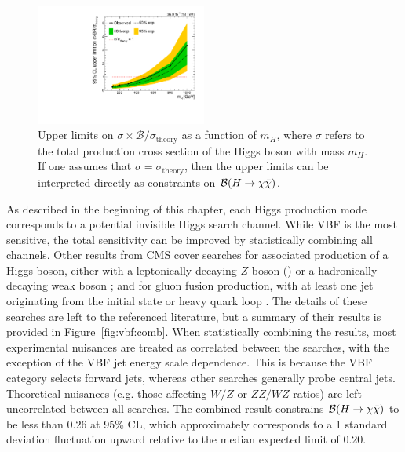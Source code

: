 \begin{figure}[]
    \begin{center}
        \includegraphics[width=0.5\textwidth]{figures/vbf/fits/mhscan_ggf.pdf}
        \caption{Upper limits on $\sigma\times \mathcal{B}/\sigma_\mathrm{theory}$ as a function of $m_H$, where $\sigma$ refers to the total production cross section of the Higgs boson with mass $m_H$.
                 If one assumes that $\sigma = \sigma_\mathrm{theory}$, then the upper limits can be interpreted directly as constraints on $\mathcal{B}(H\rightarrow\chi\bar\chi)$.}
        \label{fig:vbf:mhscan}
    \end{center}
\end{figure}

As described in the beginning of this chapter, each Higgs production mode corresponds to a potential invisible Higgs search channel.
While VBF is the most sensitive, the total sensitivity can be improved by statistically combining all channels.
Other results from CMS cover searches for associated production of a Higgs boson, either with a leptonically-decaying $Z$ boson (\needcite) or a hadronically-decaying weak boson \cite{monojet}; and for gluon fusion production, with at least one jet originating from the initial state or heavy quark loop \cite{monojet}. 
The details of these searches are left to the referenced literature, but a summary of their results is provided in Figure~\ref{fig:vbf:comb}.
When statistically combining the results, most experimental nuisances are treated as correlated between the searches, with the exception of the VBF jet energy scale dependence.
This is because the VBF category selects forward jets, whereas other searches generally probe central jets.
Theoretical nuisances (e.g. those affecting $W/Z$ or $ZZ/WZ$ ratios) are left uncorrelated between all searches.
The combined result constrains $\mathcal{B}(H\rightarrow\chi\bar\chi)$ to be less than $0.26$ at 95\% CL, which approximately corresponds to a 1 standard deviation fluctuation upward relative to the median expected limit of $0.20$.

